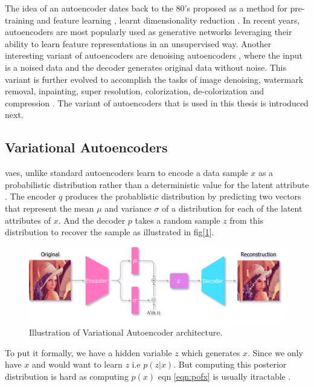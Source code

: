 The idea of an autoencoder dates back to the 80's proposed as a method for pre-training and feature learning \cite{ballard1987modular, rumelhart1985learning}, learnt dimensionality reduction \cite{hinton_dimentionality}. In recent years, autoencoders are most popularly used as generative networks leveraging their ability to learn feature representations in an unsupervised way. Another interesting variant of autoencoders are denoising autoencoders \cite{vincent2008extracting}, where the input is a noised data and the decoder generates original data without noise. This variant is further evolved to accomplish the tasks of image denoising, watermark removal, inpainting, super resolution, colorization, de-colorization and compression \cite{zhang2016colorful, imagedenoisingpaper}. The variant of autoencoders that is used in this thesis is introduced next.

\subsection{Variational Autoencoders}
\acp{vae}, unlike standard autoencoders learn to encode a data sample $x$ as a probabilistic distribution rather than a deterministic value for the latent attribute \cite{jeremy_jordan_2018}. The encoder $q$ produces the probablistic distribution by predicting two vectors that represent the mean $\mu$ and variance $\sigma$ of a distribution for each of the latent attributes of $x$. And the decoder $p$ takes a random sample $z$ from this distribution to recover the sample as illustrated in fig[\ref{fig:vae_arch}].

\begin{figure}[!h]
    \centering
    \includegraphics[scale=0.2]{figures/vae_arch.png}
    \caption{Illustration of Variational Autoencoder architecture.}
    \label{fig:vae_arch}
\end{figure}

To put it formally, we have a hidden variable $z$ which generates $x$. Since we only have $x$ and would want to learn $z$ i.e $p(z | x)$. But computing this posterior distribution is hard as computing $p(x)$ eqn \ref{eqn:pofx} is usually itractable \cite{kingma2013autoencoding}.

